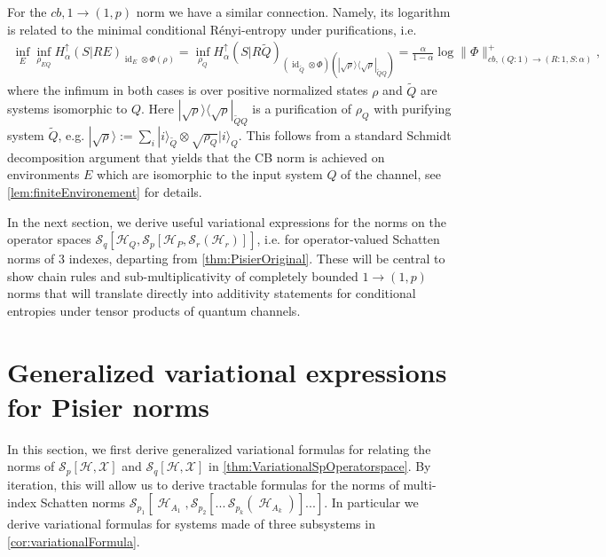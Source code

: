 \documentclass[11pt]{article}
\DeclareMathOperator{\id}{id}
\newcommand{\1}{\ensuremath{\mathbbm{1}}}
\theoremstyle{newdefinition}
\theoremstyle{newplain}
\theoremstyle{myplain}
\DeclareMathOperator{\cH}{\mathcal{H}}
\begin{document}
For the $cb,1\to(1,p)$ norm we have a similar connection. Namely, its logarithm is related to the minimal conditional R\'{e}nyi-entropy under purifications, i.e.
\begin{align} \label{eq:cb.1.to.1p.norm}
\inf_{E}\inf_{\rho_{EQ}}H^\uparrow_\alpha(S|RE)_{\id_E\otimes\Phi(\rho)} = \inf_{\rho_{Q}}H^\uparrow_\alpha(S|R\tilde{Q})_{(\id_{\tilde{Q}}\otimes\Phi)(|\sqrt{\rho}\rangle\langle\sqrt{\rho}|_{\tilde{Q}Q})}  = \frac{\alpha}{1-\alpha}\log\|\Phi\|^+_{cb,(Q:1)\to (R:1,S:\alpha)},
\end{align}
where the infimum in both cases is over positive normalized states $\rho$ and $\tilde{Q}$ are systems isomorphic to $Q$. Here $|\sqrt{\rho}\rangle\langle\sqrt{\rho}|_{\tilde{Q}Q}$ is a purification of $\rho_Q$ with purifying system $\tilde{Q}$, e.g. $|\sqrt{\rho}\rangle:=\sum_{i}|i\rangle_{\tilde{Q}}\otimes\sqrt{\rho_Q}|i\rangle_{Q}$.
This follows from a standard Schmidt decomposition argument that yields that the CB norm is achieved on environments $E$ which are isomorphic to the input system $Q$ of the channel, see \cref{lem:finiteEnvironement} for details.

In the next section, we derive useful variational expressions for the norms on the operator spaces $\mathcal{S}_q[\mathcal{H}_Q,\mathcal{S}_p[\mathcal{H}_P,\mathcal{S}_r(\mathcal{H}_r)]]$, i.e. for operator-valued Schatten norms of 3 indexes, departing from \cref{thm:PisierOriginal}. 
These will be central to show chain rules and sub-multiplicativity of completely bounded $1\to (1,p)$ norms that will translate directly into additivity statements for conditional  entropies under tensor products of quantum channels.

\section{Generalized variational expressions for Pisier norms}\label{sec:Generalized.Variational.Expressions}

In this section, we first derive generalized 
variational formulas for relating the norms of $\mathcal{S}_p[\mathcal{H},\mathcal{X}]$ and $\mathcal{S}_q[\mathcal{H},\mathcal{X}]$ in \cref{thm:VariationalSpOperatorspace}. By iteration, this will allow us to derive tractable formulas for the norms of multi-index Schatten norms $\mathcal{S}_{p_1}[\cH_{A_1},\mathcal{S}_{p_2}[...\,\mathcal{S}_{p_k}(\cH_{A_k})]...]$. In particular we derive variational formulas for systems made of three subsystems in \cref{cor:variationalFormula}. 
\end{document}
